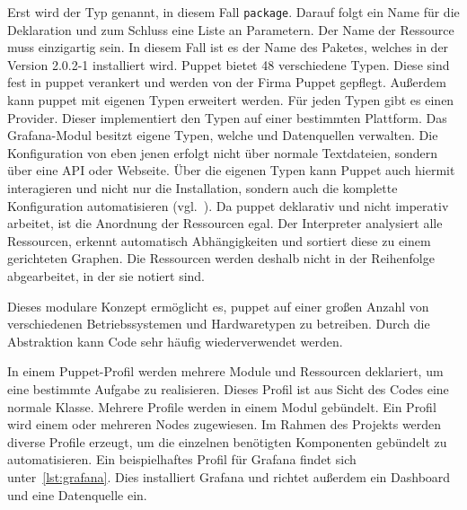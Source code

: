 Erst wird der Typ genannt, in diesem Fall \texttt{package}. Darauf folgt ein
Name für die Deklaration und zum Schluss eine Liste an Parametern. Der Name der
Ressource muss einzigartig sein. In diesem Fall ist es der Name des Paketes,
welches in der Version 2.0.2\hyp{}1 installiert wird. Puppet bietet 48
verschiedene Typen. Diese sind fest in puppet verankert und werden von der
Firma Puppet gepflegt. Außerdem kann puppet mit eigenen Typen erweitert werden.
Für jeden Typen gibt es einen Provider. Dieser implementiert den Typen auf
einer bestimmten Plattform. Das Grafana\hyp{}Modul besitzt eigene Typen, welche
 und Datenquellen verwalten. Die Konfiguration
von eben jenen erfolgt nicht über normale Textdateien, sondern über eine
\gls{API} oder Webseite. Über die eigenen Typen kann Puppet auch hiermit
interagieren und nicht nur die Installation, sondern auch die komplette
Konfiguration automatisieren (vgl.~\cite{puppet-resource-types}). Da puppet
deklarativ und nicht imperativ arbeitet, ist die Anordnung der Ressourcen egal.
Der Interpreter analysiert alle Ressourcen, erkennt automatisch Abhängigkeiten
und sortiert diese zu einem gerichteten Graphen. Die Ressourcen werden deshalb
nicht in der Reihenfolge abgearbeitet, in der sie notiert sind.

Dieses modulare Konzept ermöglicht es, puppet auf einer großen Anzahl von
verschiedenen Betriebssystemen und Hardwaretypen zu betreiben. Durch die
Abstraktion kann Code sehr häufig wiederverwendet werden.

In einem Puppet\hyp{}Profil werden mehrere Module und Ressourcen deklariert, um
eine bestimmte Aufgabe zu realisieren. Dieses Profil ist aus Sicht des Codes
eine normale Klasse. Mehrere Profile werden in einem Modul gebündelt. Ein
Profil wird einem oder mehreren Nodes zugewiesen. Im Rahmen des Projekts werden
diverse Profile erzeugt, um die einzelnen benötigten Komponenten gebündelt zu
automatisieren. Ein beispielhaftes Profil für Grafana findet sich
unter~\ref{lst:grafana}. Dies installiert Grafana und richtet außerdem ein
\gls{Dashboard} und eine Datenquelle ein.
\tm%

